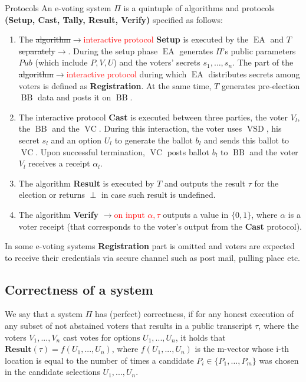 \documentclass[12pt]{article}
\newcommand{\fix}[2]{\sout{#1}$\rightarrow$\textcolor{red}{#2}}
\DeclareMathOperator{\vsd}{VSD}
\DeclareMathOperator{\ea}{EA}
\DeclareMathOperator{\bb}{BB}
\DeclareMathOperator{\voc}{VC}
\begin{document}
Protocols
An e-voting system $\Pi$ is a quintuple of algorithms and protocols  \textbf{(Setup, Cast, Tally, Result, Verify)} specified as follows:
\begin{enumerate}
\item The \fix{algorithm}{interactive protocol} \textbf{Setup} is executed by the $\ea$ and $T$\fix{separately}{}. During the setup phase $\ea$ generates $\Pi$'s public parameters $Pub$ (which include $P, V, U$) and the voters' secrets $s_1, \dots , s_n$. The part of the \fix{algorithm}{interactive protocol} during which $\ea$ distributes secrets among voters is defined as \textbf{Registration}. At the same time, $T$ generates pre-election $\bb$ data and posts it on $\bb$.
%
\item The interactive protocol \textbf{Cast} is executed between three parties, the voter $V_l$, the $\bb$ and the $\voc$. During this interaction, the voter uses $\vsd$, his secret $s_l$ and an option $U_l$ to generate the ballot $b_l$ and sends this ballot to $\voc$. Upon successful termination, $\voc$ posts ballot $b_l$ to $\bb$ and the voter $V_l$ receives a receipt $\alpha_l$.
\item The algorithm \textbf{Result} is executed by $T$ and outputs the result $\tau$ for the election or returns $\perp$ in case such result is undefined.
\item  The algorithm \textbf{Verify} \fix{}{on input $\alpha,\tau$} outputs a value in $\{0,1\}$, where  $\alpha$ is a voter receipt (that corresponds to the voter's output from the \textbf{Cast} protocol).
\end{enumerate}
In some e-voting systems \textbf{Registration} part is omitted and voters are expected to receive their credentials via secure channel such as post mail, pulling place etc.
\subsection{Correctness of a system}
We say that a system $\Pi$ has (perfect) correctness, if for any honest execution of any subset of not abstained voters that results in a public transcript $\tau$, where the voters $V_1, . . . , V_n$ cast votes for options $U_1, . . . , U_n$, it holds that $\mathbf{Result}(\tau) = f(U_1,...,U_n)$, where $f(U_1,...,U_n)$ is the m-vector whose i-th location is equal to the number of times a candidate $P_i \in \{P_1,\dots, P_m\}$ was chosen in the candidate selections $U_1, . . . , U_n$.
%
%
\end{document}
